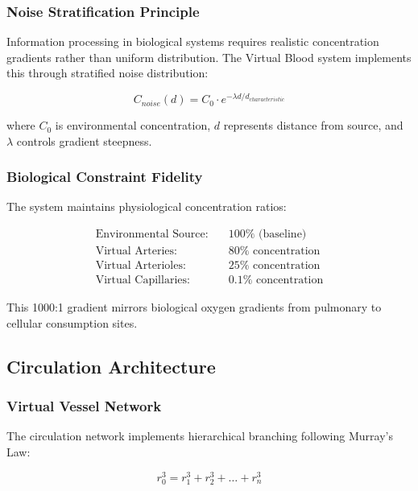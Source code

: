 \documentclass[12pt,a4paper]{article}
\begin{document}
\subsubsection{Noise Stratification Principle}

Information processing in biological systems requires realistic concentration gradients rather than uniform distribution. The Virtual Blood system implements this through stratified noise distribution:

\begin{equation}
C_{noise}(d) = C_0 \cdot e^{-\lambda d / d_{characteristic}}
\end{equation}

where $C_0$ is environmental concentration, $d$ represents distance from source, and $\lambda$ controls gradient steepness.

\subsubsection{Biological Constraint Fidelity}

The system maintains physiological concentration ratios:

\begin{align}
\text{Environmental Source:} &\quad 100\% \text{ (baseline)} \\
\text{Virtual Arteries:} &\quad 80\% \text{ concentration} \\
\text{Virtual Arterioles:} &\quad 25\% \text{ concentration} \\
\text{Virtual Capillaries:} &\quad 0.1\% \text{ concentration}
\end{align}

This 1000:1 gradient mirrors biological oxygen gradients from pulmonary to cellular consumption sites.

\subsection{Circulation Architecture}

\subsubsection{Virtual Vessel Network}

The circulation network implements hierarchical branching following Murray's Law:

\begin{equation}
r_0^3 = r_1^3 + r_2^3 + \ldots + r_n^3
\end{equation}
\end{document}
